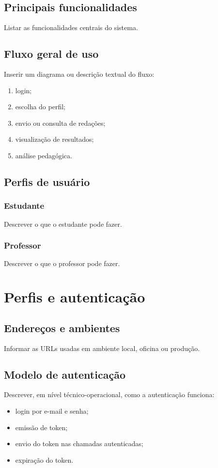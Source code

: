 \documentclass[12pt,a4paper]{article}
\begin{document}
\subsection{Principais funcionalidades}
Listar as funcionalidades centrais do sistema.

\subsection{Fluxo geral de uso}
Inserir um diagrama ou descrição textual do fluxo:
\begin{enumerate}
    \item login;
    \item escolha do perfil;
    \item envio ou consulta de redações;
    \item visualização de resultados;
    \item análise pedagógica.
\end{enumerate}

\subsection{Perfis de usuário}

\subsubsection{Estudante}
Descrever o que o estudante pode fazer.

\subsubsection{Professor}
Descrever o que o professor pode fazer.

\section{Perfis e autenticação}

\subsection{Endereços e ambientes}
Informar as URLs usadas em ambiente local, oficina ou produção.

\subsection{Modelo de autenticação}
Descrever, em nível técnico-operacional, como a autenticação funciona:
\begin{itemize}
    \item login por e-mail e senha;
    \item emissão de token;
    \item envio do token nas chamadas autenticadas;
    \item expiração do token.
\end{itemize}
\end{document}
